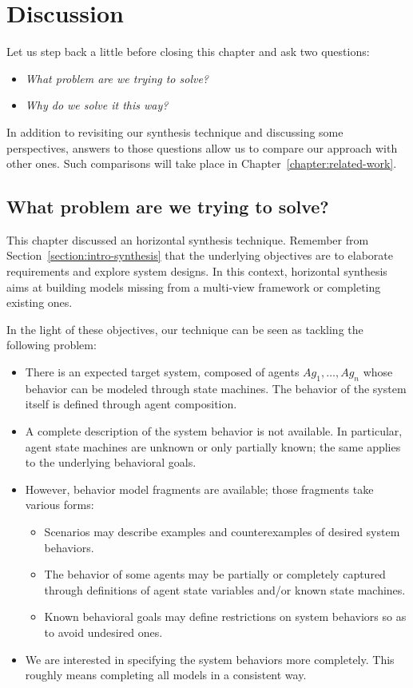 \section{Discussion\label{section:inductive-synthesis-discussion}}

Let us step back a little before closing this chapter and ask two questions:
\begin{itemize}
\item \emph{What problem are we trying to solve?}
\item \emph{Why do we solve it this way?}
\end{itemize}
In addition to revisiting our synthesis technique and discussing some perspectives, answers to those questions allow us to compare our approach with other ones. Such comparisons will take place in Chapter~\ref{chapter:related-work}.

\subsection{What problem are we trying to solve?}

This chapter discussed an horizontal synthesis technique. Remember from Section~\ref{section:intro-synthesis} that the underlying objectives are to elaborate requirements and explore system designs. In this context, horizontal synthesis aims at building models missing from a multi-view framework or completing existing ones.

In the light of these objectives, our technique can be seen as tackling the following problem:
\begin{itemize}
\item There is an expected target system, composed of agents $Ag_1, \ldots, Ag_n$ whose behavior can be modeled through state machines. The behavior of the system itself is defined through agent composition.
\item A complete description of the system behavior is not available. In particular, agent state machines are unknown or only partially known; the same applies to the underlying behavioral goals.
\item However, behavior model fragments are available; those fragments take various forms:
\begin{itemize}
\item Scenarios may describe examples and counterexamples of desired system behaviors.
\item The behavior of some agents may be partially or completely captured through definitions of agent state variables and/or known state machines.
\item Known behavioral goals may define restrictions on system behaviors so as to avoid undesired ones.
\end{itemize}
\item We are interested in specifying the system behaviors more completely. This roughly means completing all models in a consistent way.
\end{itemize}


